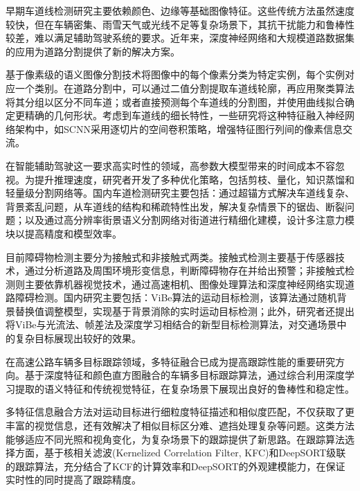 \documentclass[a4paper, UTF8, fontsize=12pt]{ctexart} %
\numberwithin{equation}{section} %
\begin{document}
早期车道线检测研究主要依赖颜色、边缘等基础图像特征。这些传统方法虽然速度较快，但在车辆密集、雨雪天气或光线不足等复杂场景下，其抗干扰能力和鲁棒性较差，难以满足辅助驾驶系统的要求。近年来，深度神经网络和大规模道路数据集的应用为道路分割提供了新的解决方案。

基于像素级的语义图像分割技术将图像中的每个像素分类为特定实例，每个实例对应一个类别\cite{asgari2021deep}。在道路分割中，可以通过二值分割提取车道线轮廓，再应用聚类算法将其分组以区分不同车道；或者直接预测每个车道线的分割图，并使用曲线拟合确定更精确的几何形状。考虑到车道线的细长特性，一些研究将这种特征融入神经网络架构中，如SCNN\cite{parashar2017scnn}采用逐切片的空间卷积策略，增强特征图行列间的像素信息交流。

在智能辅助驾驶这一要求高实时性的领域，高参数大模型带来的时间成本不容忽视。为提升推理速度，研究者开发了多种优化策略，包括剪枝\cite{zhu2017prune,park2022prune,huang2018learning}、量化\cite{goodman1975robust, fischer1986pyramid, an2025quantization}，知识蒸馏\cite{hou2019learning,hou2020inter,park2019relational}和轻量级分割网络\cite{paszke2016enet}等。国内车道检测研究主要包括：通过超锚方式解决车道线复杂、背景紊乱问题，从车道线的结构和稀疏特性出发，解决复杂情景下的锯齿、断裂问题\cite{1025006135nh}；以及通过高分辨率街景语义分割网络对街道进行精细化建模，设计多注意力模块以提高精度和模型效率\cite{1025306207nh}。

目前障碍物检测主要分为接触式和非接触式两类。接触式检测主要基于传感器技术\cite{discant2007sensors}，通过分析道路及周围环境形变信息，判断障碍物存在并给出预警；非接触式检测则主要依靠机器视觉技术\cite{badrloo2022image}，通过高速相机、图像处理算法和深度神经网络实现道路障碍检测。国内研究主要包括：ViBe\cite{barnich2010vibe}算法的运动目标检测\cite{SJSJ202406024}，该算法通过随机背景替换值调整模型，实现基于背景消除的实时运动目标检测；此外，研究者还提出将ViBe与光流法、帧差法及深度学习相结合的新型目标检测算法\cite{SCQX20250311001}，对交通场景中的复杂目标展现出较好的效果。

在高速公路车辆多目标跟踪领域，多特征融合已成为提高跟踪性能的重要研究方向。基于深度特征和颜色直方图融合的车辆多目标跟踪算法\cite{张雷2016基于颜色和边缘直方图的多目标跟踪}，通过综合利用深度学习提取的语义特征和传统视觉特征，在复杂场景下展现出良好的鲁棒性和稳定性。

多特征信息融合方法对运动目标进行细粒度特征描述和相似度匹配，不仅获取了更丰富的视觉信息，还有效解决了相似目标区分难、遮挡处理复杂等问题。这类方法能够适应不同光照和视角变化，为复杂场景下的跟踪提供了新思路。在跟踪算法选择方面，基于核相关滤波(Kernelized Correlation Filter, KFC)和DeepSORT级联的跟踪算法\cite{wang2020mtcnn}，充分结合了KCF的计算效率和DeepSORT的外观建模能力，在保证实时性的同时提高了跟踪精度。
\end{document}
